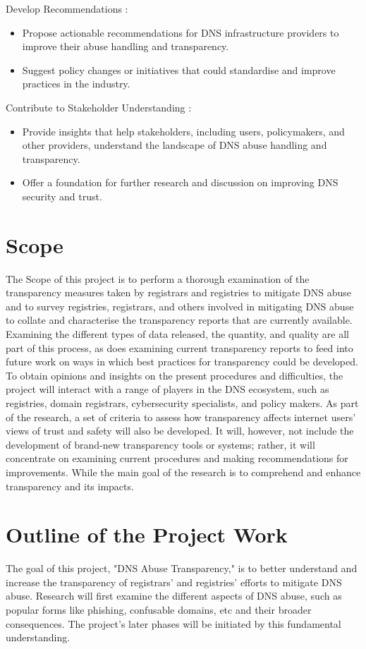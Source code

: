 Develop Recommendations :

\begin{itemize}
  \item Propose actionable recommendations for DNS infrastructure providers to improve their abuse handling and transparency.
  \item Suggest policy changes or initiatives that could standardise and improve practices in the industry.
\end{itemize}

Contribute to Stakeholder Understanding : 

\begin{itemize}
  \item Provide insights that help stakeholders, including users, policymakers, and other providers, understand the landscape of DNS abuse handling and transparency.
  \item Offer a foundation for further research and discussion on improving DNS security and trust.
\end{itemize}

\section{Scope}	
The Scope of this project is to perform a thorough examination of the transparency measures taken by registrars and registries to mitigate DNS abuse and to survey registries, registrars, and others involved in mitigating DNS abuse to collate and characterise the transparency reports that are currently available. Examining the different types of data released, the quantity, and quality are all part of this process, as does examining current transparency reports to feed into future work on ways in which best practices for transparency could be developed. To obtain opinions and insights on the present procedures and difficulties, the project will interact with a range of players in the DNS ecosystem, such as registries, domain registrars, cybersecurity specialists, and policy makers. As part of the research, a set of criteria to assess how transparency affects internet users' views of trust and safety will also be developed. It will, however, not include the development of brand-new transparency tools or systems; rather, it will concentrate on examining current procedures and making recommendations for improvements. While the main goal of the research is to comprehend and enhance transparency and its impacts. 

\section{ Outline of the Project Work} 
The goal of this project, "DNS Abuse Transparency," is to better understand and increase the transparency of registrars' and registries' efforts to mitigate DNS abuse. Research will first examine the different aspects of DNS abuse, such as popular forms like phishing, confusable domains, etc and their broader consequences. The project's later phases will be initiated by this fundamental understanding.

